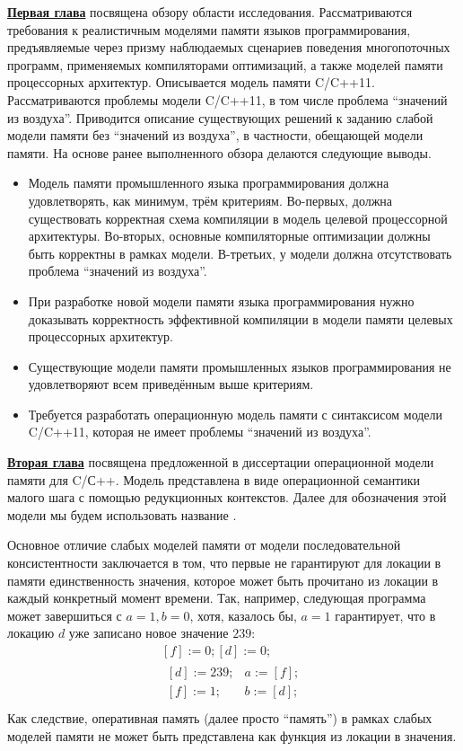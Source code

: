 \underline{\textbf{Первая глава}} посвящена обзору области исследования.
Рассматриваются требования к реалистичным моделями памяти
языков программирования, предъявляемые через призму наблюдаемых сценариев поведения многопоточных программ,
применяемых компиляторами оптимизаций, а также моделей памяти процессорных архитектур.
Описывается модель памяти C/C++11. Рассматриваются проблемы модели C/C++11, в том числе
проблема ``значений из воздуха''. Приводится описание существующих решений к заданию
слабой модели памяти без ``значений из воздуха'', в частности, обещающей модели памяти.
На основе ранее выполненного обзора делаются следующие выводы.
\begin{itemize}
  \item Модель памяти промышленного языка программирования должна удовлетворять, как минимум, трём критериям.
    Во-первых, должна существовать корректная схема компиляции в модель целевой процессорной
    архитектуры.
    Во-вторых, основные компиляторные оптимизации должны быть корректны в рамках модели.
    В-третьих, у модели должна отсутствовать проблема ``значений из воздуха''.
  \item При разработке новой модели памяти языка программирования нужно доказывать корректность эффективной компиляции
     в модели памяти целевых процессорных архитектур.
  \item Существующие модели памяти промышленных языков программирования не удовлетворяют всем приведённым выше
    критериям.
  \item Требуется разработать операционную модель памяти с синтаксисом модели C/C++11, которая
    не имеет проблемы ``значений из воздуха''.
\end{itemize}

\underline{\textbf{Вторая глава}} посвящена предложенной в диссертации операционной  модели памяти для C/С++. Модель представлена в виде операционной семантики малого шага с помощью редукционных
контекстов. Далее для обозначения этой модели мы будем использовать название \OpCpp.

Основное отличие слабых моделей памяти от модели последовательной консистентности заключается в том, что
первые не гарантируют для локации в памяти единственность значения, которое может быть прочитано из локации
в каждый конкретный момент времени.
Так, например, следующая программа может завершиться с $a = 1, b = 0$, хотя, казалось бы, $a = 1$ гарантирует, что
в локацию $d$ уже записано новое значение $239$:
\[
\begin{array}{c}
[f] := 0; [d] := 0; \\
\begin{array}{l||l}
  {} [d] := 239; & a := [f]; \\
  {} [f] := 1;   & b := [d]; \\
\end{array}
\end{array}
\]
Как следствие, оперативная память (далее просто ``память'') в рамках слабых моделей памяти не может быть представлена как функция из локации в значения.

